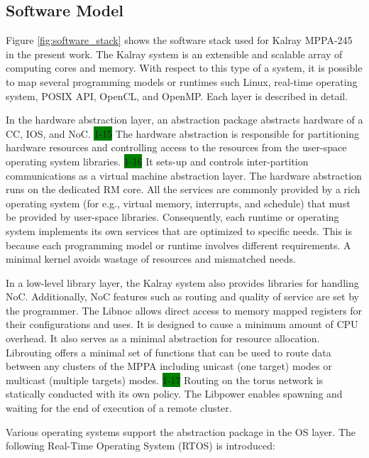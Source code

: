 \documentclass[conference,compsoc]{IEEEtran}
\begin{document}
\subsection{Software Model}
\label{sec:software_model}
Figure \ref{fig:software_stack} shows the software stack used for Kalray MPPA-245 in the present work.
The Kalray system is an extensible and scalable array of computing cores and memory.
With respect to this type of a system, it is possible to map several programming models or runtimes such Linux, real-time operating system, POSIX API, OpenCL, and OpenMP.
Each layer is described in detail.

In the hardware abstraction layer, an abstraction package abstracts hardware of a CC, IOS, and NoC.
\colorbox{green}{1-15} %
The hardware abstraction is responsible for partitioning hardware resources and controlling access to the resources from the user-space operating system libraries.
\colorbox{green}{1-16} 
It sets-up and controls inter-partition communications as a virtual machine abstraction layer.
The hardware abstraction runs on the dedicated RM core.
All the services are commonly provided by a rich operating system (for e.g., virtual memory, interrupts, and schedule) that must be provided by user-space libraries.
Consequently, each runtime or operating system implements its own services that are optimized to specific needs.
This is because each programming model or runtime involves different requirements.
A minimal kernel avoids wastage of resources and mismatched needs.

In a low-level library layer, the Kalray system also provides libraries for handling NoC.
Additionally, NoC features such as routing and quality of service are set by the programmer.
The Libnoc allows direct access to memory mapped registers for their configurations and uses.
It is designed to cause a minimum amount of CPU overhead.
It also serves as a minimal abstraction for resource allocation.
Librouting offers a minimal set of functions that can be used to route data between any clusters of the MPPA including unicast (one target) modes or multicast (multiple targets) modes.
\colorbox{green}{1-17}
Routing on the torus network is statically conducted with its own policy.
The Libpower enables spawning and waiting for the end of execution of a remote cluster.

Various operating systems support the abstraction package in the OS layer.
The following Real-Time Operating System (RTOS) is introduced:
\end{document}
